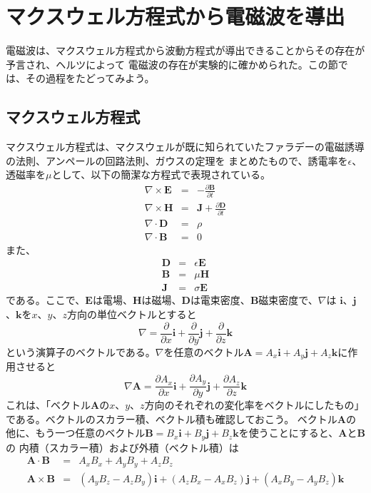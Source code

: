 \section*{マクスウェル方程式から電磁波を導出}
電磁波は、マクスウェル方程式から波動方程式が導出できることからその存在が予言され、ヘルツによって
電磁波の存在が実験的に確かめられた。この節では、その過程をたどってみよう。
\subsection*{マクスウェル方程式}
マクスウェル方程式は、マクスウェルが既に知られていたファラデーの電磁誘導の法則、アンペールの回路法則、ガウスの定理を
まとめたもので、誘電率を$\epsilon$、透磁率を$\mu$として、以下の簡潔な方程式で表現されている。
\begin{eqnarray}
\nabla \times \bm{E} &=& -\frac{\partial \bm{B}}{\partial t} \label{eq:mxwl-E}\\
\nabla \times \bm{H} &=& \bm{J} + \frac{\partial \bm{D}}{\partial t} \label{eq:mxwl-H}\\
\nabla \cdot \bm{D}  &=& \rho \label{eq:mxwl-D}\\
\nabla \cdot \bm{B}  &=& 0 \label{eq:mxwl-B}
\end{eqnarray}
また、
\begin{eqnarray}
\bm{D} &=& \epsilon \bm{E} \label{eq:mxwl-D2}\\
\bm{B} &=& \mu \bm{H} \label{eq:mxwl-B2}\\
\bm{J} &=& \sigma \bm{E} \label{eq:mxwl-J}
\end{eqnarray}
である。ここで、$\bm{E}$は電場、$\bm{H}$は磁場、$\bm{D}$は電束密度、$\bm{B}$磁束密度で、$\nabla$は
$\bm{i}$、$\bm{j}$、$\bm{k}$を$x$、$y$、$z$方向の単位ベクトルとすると
\[
\nabla = \frac{\partial}{\partial x} \bm{i} + \frac{\partial}{\partial y} \bm{j} + \frac{\partial}{\partial z} \bm{k}
\]
という演算子のベクトルである。$\nabla$を任意のベクトル$\bm{A}=A_x\bm{i} + A_y\bm{j} + A_z\bm{k}$に作用させると
\[
\nabla\bm{A} = \frac{\partial A_x}{\partial x} \bm{i} + \frac{\partial A_y}{\partial y} \bm{j} + \frac{\partial A_z}{\partial z} \bm{k}
\]
これは、「ベクトル$\bm{A}$の$x$、$y$、$z$方向のそれぞれの変化率をベクトルにしたもの」である。ベクトルのスカラー積、ベクトル積も確認しておこう。
ベクトル$\bm{A}$の他に、もう一つ任意のベクトル$\bm{B}=B_x\bm{i} + B_y\bm{j} + B_z\bm{k}$を使うことにすると、$\bm{A}$と$\bm{B}$の
内積（スカラー積）および外積（ベクトル積）は
\begin{eqnarray*}
\bm{A} \cdot \bm{B} &=& A_xB_x + A_yB_y + A_zB_z \\
\bm{A}\times\bm{B} &=& (A_yB_z - A_zB_y)\bm{i} + (A_zB_x - A_xB_z)\bm{j} + (A_xB_y - A_yB_z)\bm{k}
\end{eqnarray*}
